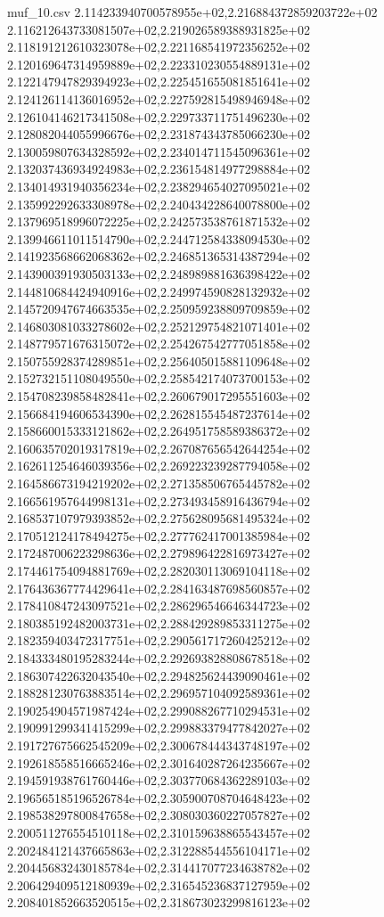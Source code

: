 \begin{filecontents*}{muf_10.csv}
2.114233940700578955e+02,2.216884372859203722e+02
2.116212643733081507e+02,2.219026589388931825e+02
2.118191212610323078e+02,2.221168541972356252e+02
2.120169647314959889e+02,2.223310230554889131e+02
2.122147947829394923e+02,2.225451655081851641e+02
2.124126114136016952e+02,2.227592815498946948e+02
2.126104146217341508e+02,2.229733711751496230e+02
2.128082044055996676e+02,2.231874343785066230e+02
2.130059807634328592e+02,2.234014711545096361e+02
2.132037436934924983e+02,2.236154814977298884e+02
2.134014931940356234e+02,2.238294654027095021e+02
2.135992292633308978e+02,2.240434228640078800e+02
2.137969518996072225e+02,2.242573538761871532e+02
2.139946611011514790e+02,2.244712584338094530e+02
2.141923568662068362e+02,2.246851365314387294e+02
2.143900391930503133e+02,2.248989881636398422e+02
2.144810684424940916e+02,2.249974590828132932e+02
2.145720947674663535e+02,2.250959238809709859e+02
2.146803081033278602e+02,2.252129754821071401e+02
2.148779571676315072e+02,2.254267542777051858e+02
2.150755928374289851e+02,2.256405015881109648e+02
2.152732151108049550e+02,2.258542174073700153e+02
2.154708239858482841e+02,2.260679017295551603e+02
2.156684194606534390e+02,2.262815545487237614e+02
2.158660015333121862e+02,2.264951758589386372e+02
2.160635702019317819e+02,2.267087656542644254e+02
2.162611254646039356e+02,2.269223239287794058e+02
2.164586673194219202e+02,2.271358506765445782e+02
2.166561957644998131e+02,2.273493458916436794e+02
2.168537107979393852e+02,2.275628095681495324e+02
2.170512124178494275e+02,2.277762417001385984e+02
2.172487006223298636e+02,2.279896422816973427e+02
2.174461754094881769e+02,2.282030113069104118e+02
2.176436367774429641e+02,2.284163487698560857e+02
2.178410847243097521e+02,2.286296546646344723e+02
2.180385192482003731e+02,2.288429289853311275e+02
2.182359403472317751e+02,2.290561717260425212e+02
2.184333480195283244e+02,2.292693828808678518e+02
2.186307422632043540e+02,2.294825624439090461e+02
2.188281230763883514e+02,2.296957104092589361e+02
2.190254904571987424e+02,2.299088267710294531e+02
2.190991299341415299e+02,2.299883379477842027e+02
2.191727675662545209e+02,2.300678444343748197e+02
2.192618558516665246e+02,2.301640287264235667e+02
2.194591938761760446e+02,2.303770684362289103e+02
2.196565185196526784e+02,2.305900708704648423e+02
2.198538297800847658e+02,2.308030360227057827e+02
2.200511276554510118e+02,2.310159638865543457e+02
2.202484121437665863e+02,2.312288544556104171e+02
2.204456832430185784e+02,2.314417077234638782e+02
2.206429409512180939e+02,2.316545236837127959e+02
2.208401852663520515e+02,2.318673023299816123e+02

\end{filecontents*}
